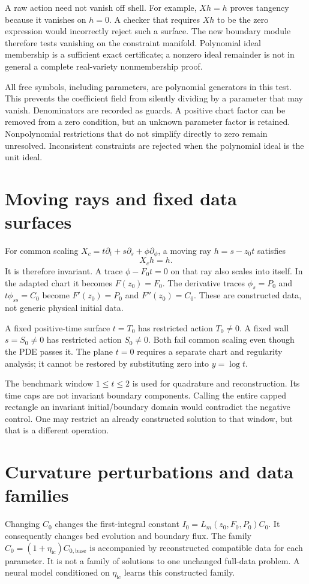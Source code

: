 \documentclass[12pt,a4paper,oneside]{report}
\numberwithin{equation}{chapter}
\begin{document}
A raw action need not vanish off shell. For example, $Xh=h$ proves tangency
because it vanishes on $h=0$. A checker that requires $Xh$ to be the zero
expression would incorrectly reject such a surface. The new boundary module
therefore tests vanishing on the constraint manifold. Polynomial ideal
membership is a sufficient exact certificate; a nonzero ideal remainder is
not in general a complete real-variety nonmembership proof.

All free symbols, including parameters, are polynomial generators in this
test. This prevents the coefficient field from silently dividing by a
parameter that may vanish. Denominators are recorded as guards. A positive
chart factor can be removed from a zero condition, but an unknown parameter
factor is retained. Nonpolynomial restrictions that do not simplify directly
to zero remain unresolved. Inconsistent constraints are rejected when the
polynomial ideal is the unit ideal.

\section{Moving rays and fixed data surfaces}
For common scaling $X_c=t\partial_t+s\partial_s+\phi\partial_\phi$, a moving
ray $h=s-z_0t$ satisfies
\begin{equation}
X_ch=h.
\end{equation}
It is therefore invariant. A trace $\phi-F_0t=0$ on that ray also scales into
itself. In the adapted chart it becomes $F(z_0)=F_0$. The derivative traces
$\phi_s=P_0$ and $t\phi_{ss}=C_0$ become $F'(z_0)=P_0$ and
$F''(z_0)=C_0$. These are constructed data, not generic physical initial data.

A fixed positive-time surface $t=T_0$ has restricted action $T_0\ne0$.
A fixed wall $s=S_0\ne0$ has restricted action $S_0\ne0$. Both fail common
scaling even though the PDE passes it. The plane $t=0$ requires a separate
chart and regularity analysis; it cannot be restored by substituting zero
into $y=\log t$.

The benchmark window $1\leq t\leq2$ is used for quadrature and reconstruction.
Its time caps are not invariant boundary components. Calling the entire
capped rectangle an invariant initial/boundary domain would contradict the
negative control. One may restrict an already constructed solution to that
window, but that is a different operation.

\section{Curvature perturbations and data families}
Changing $C_0$ changes the first-integral constant $I_0=L_m(z_0,F_0,P_0)C_0$.
It consequently changes bed evolution and boundary flux. The family
$C_0=(1+\eta_{\mathrm{ic}})C_{0,\mathrm{base}}$ is accompanied by reconstructed
compatible data for each parameter. It is not a family of solutions to one
unchanged full-data problem. A neural model conditioned on $\eta_{\mathrm{ic}}$
learns this constructed family.
\end{document}

